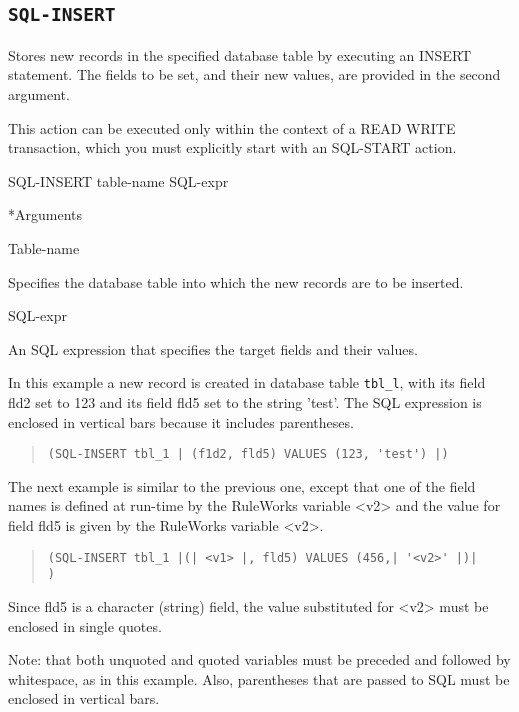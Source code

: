 {{\subsection{\tt{SQL-INSERT}}

Stores new records in the specified database table by
executing an INSERT statement. The fields to be set, and
their new values, are provided in the second argument.

This action can be executed only within the context of a READ
WRITE transaction, which you must explicitly start with an
SQL-START action.



\Format

SQL-INSERT table-name SQL-expr



*Arguments

Table-name

Specifies the database table into which the new records are
to be inserted.

SQL-expr

An SQL expression that specifies the target fields and their
values.



\Example

In this example a new record is created in database table
\verb|tbl_l|, with its field fld2 set to 123 and its field fld5 set
to the string 'test'. The SQL expression is enclosed in
vertical bars because it includes parentheses.

\begin{quote}
\begin{verbatim}
(SQL-INSERT tbl_1 | (f1d2, fld5) VALUES (123, 'test') |)
\end{verbatim}
\end{quote}

The next example is similar to the previous one, except that
one of the field names is defined at run-time by the
RuleWorks variable <v2> and the value for field fld5 is given
by the RuleWorks variable <v2>.
\begin{quote}
\begin{verbatim}
(SQL-INSERT tbl_1 |(| <v1> |, fld5) VALUES (456,| '<v2>' |)|
)
\end{verbatim}
\end{quote}

Since fld5 is a character (string) field, the value
substituted for <v2> must be enclosed in single quotes.

Note: that both unquoted and quoted variables must be
preceded and followed by whitespace, as in this example.
Also, parentheses that are passed to SQL must be enclosed in
vertical bars.

}}
